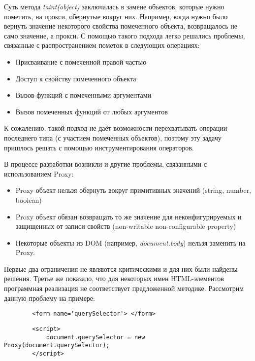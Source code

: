 	Суть метода \textit{taint(object)} заключалась в замене объектов, которые нужно пометить, на прокси, обернутые вокруг них. Например, когда нужно было вернуть значение некоторого свойства помеченного объекта, возвращалось не само значение, а прокси. С помощью такого подхода легко решались проблемы, связанные с распространением пометок в следующих операциях:
	

	\begin{itemize}
		\item Присваивание с помеченной правой частью
		\item Доступ к свойству помеченного объекта
		\item Вызов функций с помеченными аргументами
		\item Вызов помеченных функций от любых аргументов
	\end{itemize}


	К сожалению, такой подход не даёт возможности перехватывать операции последнего типа (с участием помеченных объектов), поэтому эту задачу пришлось решать с помощью инструментирования операторов.


	В процессе разработки возникли и другие проблемы, связанными с использованием Proxy:


	\begin{itemize}
		\item Proxy объект нельзя обернуть вокруг примитивных значений (string, number, boolean)
		\item Proxy объект обязан возвращать то же значение для неконфигурируемых и защищенных от записи свойств (non-writable non-configurable property)
		\item Некоторые объекты из DOM (например, \textit{document.body}) нельзя заменить на Proxy.
	\end{itemize}


	Первые два ограничения не являются критическими и для них были найдены решения. Третье же показало, что для некоторых имен HTML-элементов программная реализация не соответствует предложенной методике. Рассмотрим данную проблему на примере:

	\begin{lstlisting}
		<form name='querySelector'> </form>
	\end{lstlisting}

	\begin{lstlisting}
		<script>
			document.querySelector = new Proxy(document.querySelector);
		</script>
	\end{lstlisting}

